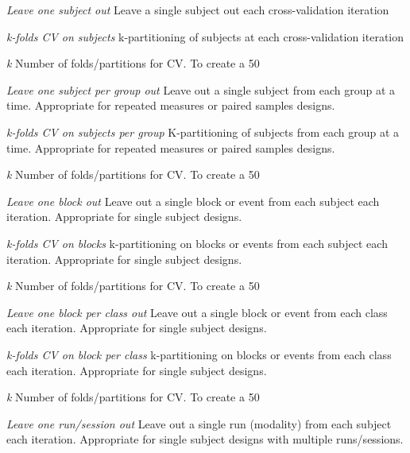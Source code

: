 \textit{Leave one subject out}
Leave a single subject out each cross-validation iteration


\textit{k-folds CV on subjects}
k-partitioning of subjects at each cross-validation iteration


\textit{k}
Number of folds/partitions for CV. To create a 50%


\textit{Leave one subject per group out}
Leave out a single subject from each group at a time. Appropriate for repeated measures or paired samples designs.


\textit{k-folds CV on subjects per group}
K-partitioning of subjects from each group at a time. Appropriate for repeated measures or paired samples designs.


\textit{k}
Number of folds/partitions for CV. To create a 50%


\textit{Leave one block out}
Leave out a single block or event from each subject each iteration. Appropriate for single subject designs.


\textit{k-folds CV on blocks}
k-partitioning on blocks or events from each subject each iteration. Appropriate for single subject designs.


\textit{k}
Number of folds/partitions for CV. To create a 50%


\textit{Leave one block per class out}
Leave out a single block or event from each class each iteration. Appropriate for single subject designs.


\textit{k-folds CV on block per class}
k-partitioning on blocks or events from each class each iteration. Appropriate for single subject designs.


\textit{k}
Number of folds/partitions for CV. To create a 50%


\textit{Leave one run/session out}
Leave out a single run (modality) from each subject each iteration. Appropriate for single subject designs with multiple runs/sessions.


